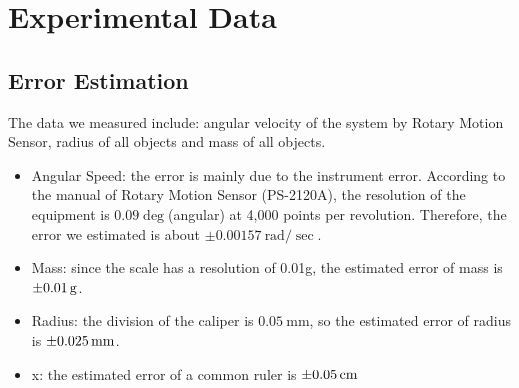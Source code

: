 \documentclass[12pt]{article}
\begin{document}
	\section{Experimental Data}
	\subsection{Error Estimation}
	The data we measured include: angular velocity of the system by Rotary Motion Sensor, radius of all objects and mass of all objects.
	\begin{itemize}
		\item Angular Speed: the error is mainly due to the instrument error. According to the manual of Rotary Motion Sensor (PS-2120A), the resolution of the equipment is $0.09\deg$(angular) at 4,000 points per revolution. Therefore, the error we estimated is about $\pm \SI{0.00157}{\radian/\sec}$.
		\item Mass: since the scale has a resolution of 0.01g, the estimated error of mass is $\SI{\pm0.01}{\gram}$.
		\item Radius: the division of the caliper is $\SI{0.05}{\mm}$, so the estimated error of radius is $\SI{\pm0.025}{\mm}$.
		\item x: the estimated error of a common ruler is $\SI{\pm0.05}{\centi\meter}$
	\end{itemize}
\end{document}
